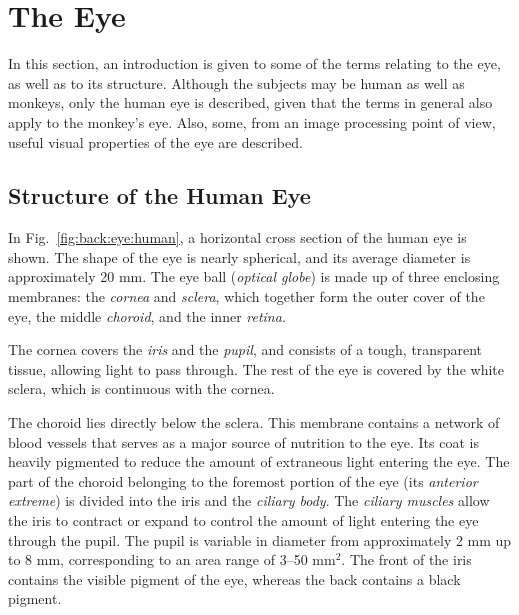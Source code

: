 
\section{The Eye}
\label{back:eye}

In this section, an introduction is given to some of the terms
relating to the eye, as well as to its structure.  Although the
subjects may be human as well as monkeys, only the human eye is
described, given that the terms in general also apply to the monkey's
eye.  Also, some, from an image processing point of view, useful
visual properties of the eye are described.

\subsection{Structure of the Human Eye}
\label{back:eye:structure}

In Fig.~\ref{fig:back:eye:human}, a horizontal cross section of the
human eye is shown.  The shape of the eye is nearly spherical, and its
average diameter is approximately 20 mm.  The eye ball ({\em optical
  globe\/}) is made up of three enclosing membranes: the {\em
  cornea\/} and {\em sclera\/}, which together form the outer cover of
the eye, the middle {\em choroid\/}, and the inner {\em retina\/}.

The cornea covers the {\em iris\/} and the {\em pupil\/}, and consists
of a tough, transparent tissue, allowing light to pass through.  The
rest of the eye is covered by the white sclera, which is continuous
with the cornea.

The choroid lies directly below the sclera.  This membrane contains a
network of blood vessels that serves as a major source of nutrition to
the eye.  Its coat is heavily pigmented to reduce the amount of
extraneous light entering the eye.  The part of the choroid belonging
to the foremost portion of the eye (its {\em anterior extreme\/}) is
divided into the iris and the {\em ciliary body\/}.  The {\em ciliary
  muscles\/} allow the iris to contract or expand to control the
amount of light entering the eye through the pupil.  The pupil is
variable in diameter from approximately 2 mm up to 8 mm, corresponding
to an area range of 3--50 mm$^{2}$.  The front of the iris contains
the visible pigment of the eye, whereas the back contains a black
pigment.

